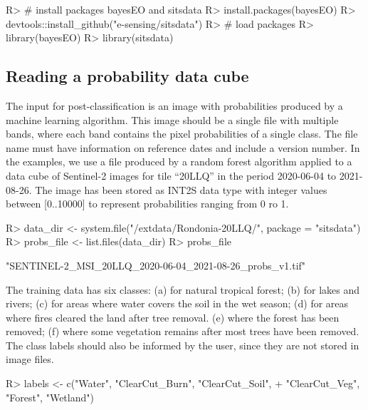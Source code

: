 \documentclass[
  shortnames]{jss}
\begin{document}
\begin{CodeChunk}
\begin{CodeInput}
R> # install packages bayesEO and sitsdata
R> install.packages(bayesEO)
R> devtools::install_github("e-sensing/sitsdata")
R> # load packages
R> library(bayesEO)
R> library(sitsdata)
\end{CodeInput}
\end{CodeChunk}

\hypertarget{reading-a-probability-data-cube}{%
\subsection{Reading a probability data cube}\label{reading-a-probability-data-cube}}

The input for post-classification is an image with probabilities produced by a machine learning algorithm. This image should be a single file with multiple bands, where each band contains the pixel probabilities of a single class. The file name must have information on reference dates and include a version number. In the examples, we use a file produced by a random forest algorithm applied to a data cube of Sentinel-2 images for tile ``20LLQ'' in the period 2020-06-04 to 2021-08-26. The image has been stored as INT2S data type with integer values between {[}0..10000{]} to represent probabilities ranging from 0 ro 1.

\begin{CodeChunk}
\begin{CodeInput}
R> data_dir <- system.file("/extdata/Rondonia-20LLQ/", package = "sitsdata")
R> probs_file <- list.files(data_dir)
R> probs_file
\end{CodeInput}
\begin{CodeOutput}
[1] "SENTINEL-2_MSI_20LLQ_2020-06-04_2021-08-26_probs_v1.tif"
\end{CodeOutput}
\end{CodeChunk}

The training data has six classes: (a)  for natural tropical forest; (b)  for lakes and rivers; (c)  for areas where water covers the soil in the wet season; (d)  for areas where fires cleared the land after tree removal. (e)  where the forest has been removed; (f)  where some vegetation remains after most trees have been removed. The class labels should also be informed by the user, since they are not stored in image files.

\begin{CodeChunk}
\begin{CodeInput}
R> labels <- c("Water", "ClearCut_Burn", "ClearCut_Soil",
+             "ClearCut_Veg", "Forest", "Wetland")
\end{CodeInput}
\end{CodeChunk}
\end{document}
